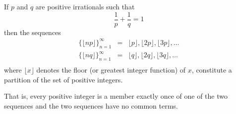 \documentclass{article}
\begin{document}
If $p$ and $q$ are positive irrationals such that
$$\frac{1}{p}+\frac{1}{q}=1$$
then the sequences
\begin{eqnarray*}
\{\lfloor np\rfloor\}_{n=1}^\infty&=&\lfloor p\rfloor,\lfloor 2p\rfloor,\lfloor 3p\rfloor,\ldots\\
\{\lfloor nq\rfloor\}_{n=1}^\infty&=&\lfloor q\rfloor,\lfloor 2q\rfloor,\lfloor 3q\rfloor,\ldots\\
\end{eqnarray*}
where $\lfloor x\rfloor$ denotes the floor (or greatest integer function) of $x$, constitute a partition of the set of positive integers.

That is, every positive integer is a member exactly once of one of the two sequences and the two sequences have no common terms.
\end{document}
